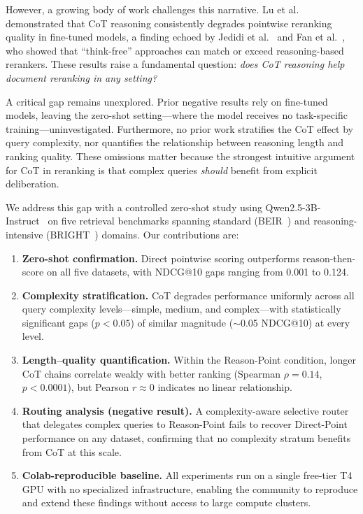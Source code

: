 \documentclass[sigconf,review]{acmart}
\begin{document}
However, a growing body of work challenges this narrative. Lu et al.~\cite{lu2025rethinking} demonstrated that CoT reasoning consistently degrades pointwise reranking quality in fine-tuned models, a finding echoed by Jedidi et al.~\cite{jedidi2025dont} and Fan et al.~\cite{fan2025tfrank}, who showed that ``think-free'' approaches can match or exceed reasoning-based rerankers. These results raise a fundamental question: \emph{does CoT reasoning help document reranking in any setting?}

A critical gap remains unexplored. Prior negative results rely on fine-tuned models, leaving the zero-shot setting---where the model receives no task-specific training---uninvestigated. Furthermore, no prior work stratifies the CoT effect by query complexity, nor quantifies the relationship between reasoning length and ranking quality. These omissions matter because the strongest intuitive argument for CoT in reranking is that complex queries \emph{should} benefit from explicit deliberation.

We address this gap with a controlled zero-shot study using Qwen2.5-3B-Instruct~\cite{qwen25tech} on five retrieval benchmarks spanning standard (BEIR~\cite{thakur2021beir}) and reasoning-intensive (BRIGHT~\cite{su2024bright}) domains. Our contributions are:

\begin{enumerate}
    \item \textbf{Zero-shot confirmation.} Direct pointwise scoring outperforms reason-then-score on all five datasets, with NDCG@10 gaps ranging from 0.001 to 0.124.
    \item \textbf{Complexity stratification.} CoT degrades performance uniformly across all query complexity levels---simple, medium, and complex---with statistically significant gaps ($p<0.05$) of similar magnitude ($\sim$0.05 NDCG@10) at every level.
    \item \textbf{Length--quality quantification.} Within the Reason-Point condition, longer CoT chains correlate weakly with better ranking (Spearman $\rho=0.14$, $p<0.0001$), but Pearson $r\approx0$ indicates no linear relationship.
    \item \textbf{Routing analysis (negative result).} A complexity-aware selective router that delegates complex queries to Reason-Point fails to recover Direct-Point performance on any dataset, confirming that no complexity stratum benefits from CoT at this scale.
    \item \textbf{Colab-reproducible baseline.} All experiments run on a single free-tier T4 GPU with no specialized infrastructure, enabling the community to reproduce and extend these findings without access to large compute clusters.
\end{enumerate}
\end{document}
